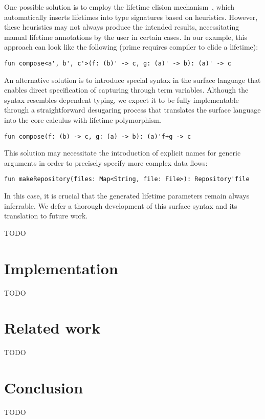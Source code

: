 \documentclass[11pt]{article}
\begin{document}
    One possible solution is to employ the lifetime elision mechanism~\cite{matsakis2014rust}, which automatically inserts lifetimes into type signatures based on heuristics.
    However, these heuristics may not always produce the intended results, necessitating manual lifetime annotations by the user in certain cases.
    In our example, this approach can look like the following (prime requires compiler to elide a lifetime):
    \begin{lstlisting}[language=colang]
        fun compose<a', b', c'>(f: (b)' -> c, g: (a)' -> b): (a)' -> c
    \end{lstlisting}

    An alternative solution is to introduce special syntax in the surface language that enables direct specification of capturing through term variables.
    Although the syntax resembles dependent typing, we expect it to be fully implementable through a straightforward desugaring process that translates the surface language into the core calculus with lifetime polymorphism.
    \begin{lstlisting}[language=colang]
        fun compose(f: (b) -> c, g: (a) -> b): (a)'f+g -> c
    \end{lstlisting}

    This solution may necessitate the introduction of explicit names for generic arguments in order to precisely specify more complex data flows:
    \begin{lstlisting}[language=colang]
        fun makeRepository(files: Map<String, file: File>): Repository'file
    \end{lstlisting}

    In this case, it is crucial that the generated lifetime parameters remain always inferrable.
    We defer a thorough development of this surface syntax and its translation to future work.

    TODO %


    \section{Implementation}

    TODO %


    \section{Related work}

    TODO %


    \section{Conclusion}

    TODO %
\end{document}
